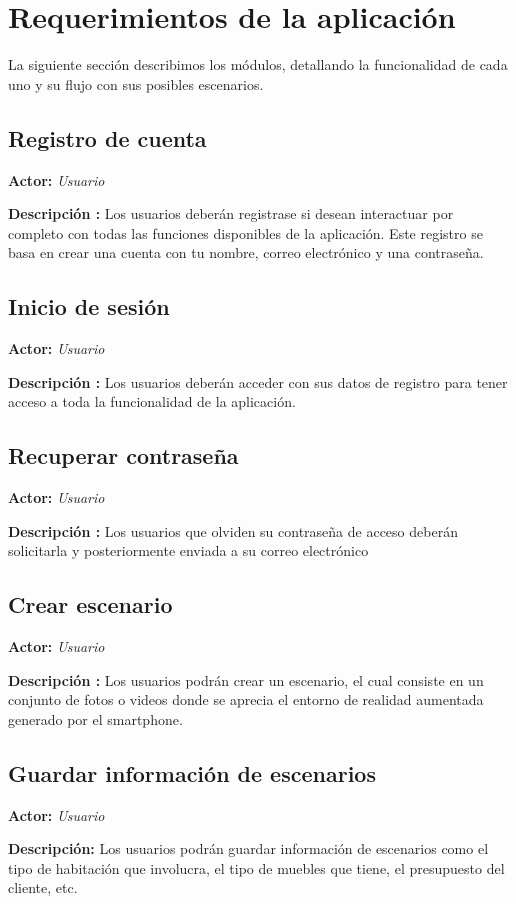 \section{Requerimientos de la aplicación}
La siguiente sección describimos los módulos, detallando la funcionalidad de cada uno y su flujo con sus posibles escenarios.\par

\subsection{Registro de cuenta}
\textbf{Actor:} \textit{Usuario} \par
\textbf{Descripción :} Los usuarios deberán registrase si desean interactuar por completo con todas las funciones disponibles de la aplicación. Este registro se basa en crear una cuenta con tu nombre, correo electrónico y una contraseña.

\subsection{Inicio de sesión}
\textbf{Actor:} \textit{Usuario} \par
\textbf{Descripción :} Los usuarios deberán acceder con sus datos de registro para tener acceso a toda la funcionalidad de la aplicación.

\subsection{Recuperar contraseña}
\textbf{Actor:} \textit{Usuario} \par
\textbf{Descripción :} Los usuarios que olviden su contraseña de acceso deberán solicitarla y posteriormente enviada a su correo electrónico

\subsection{Crear escenario}
\textbf{Actor:} \textit{Usuario} \par
\textbf{Descripción :} Los usuarios podrán crear un escenario, el cual consiste en un conjunto de fotos o videos donde se aprecia el entorno de realidad aumentada generado por el smartphone.

\subsection{Guardar información de escenarios}
\textbf{Actor:} \textit{Usuario} \par
\textbf{Descripción:} Los usuarios podrán guardar información de escenarios como el tipo de habitación que involucra, el tipo de muebles que tiene, el presupuesto del cliente, etc.

